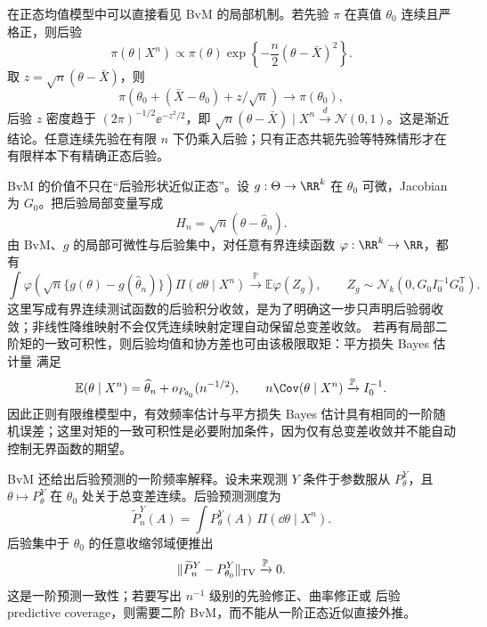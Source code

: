 \begin{workedexample}[正态似然仍须区别有限样本后验]
在正态均值模型中可以直接看见 BvM 的局部机制。若先验 $\pi$ 在真值 $\theta_0$ 连续且严格正，则后验
\[
\pi(\theta\mid X^n)\propto\pi(\theta)\exp\!\left\{-\frac n2(\theta-\bar X)^2\right\}.
\]
取 $z=\sqrt n(\theta-\bar X)$，则
\[
\pi(\theta_0+(\bar X-\theta_0)+z/\sqrt n)\to\pi(\theta_0),
\]
后验 $z$ 密度趋于 $(2\pi)^{-1/2}\ee^{-z^2/2}$，即 $\sqrt n(\theta-\bar X)\mid X^n\xrightarrow{d}\mathcal N(0,1)$。这是渐近结论。任意连续先验在有限 $n$ 下仍乘入后验；只有正态共轭先验等特殊情形才在有限样本下有精确正态后验。
\end{workedexample}

\begin{corollary}
BvM 的价值不只在“后验形状近似正态”。设 $g:\Theta\to\RR^k$ 在 $\theta_0$ 可微，Jacobian 为 $G_0$。把后验局部变量写成
\[
 H_n=\sqrt n(\theta-\widehat\theta_n).
\]
由 BvM、$g$ 的局部可微性与后验集中，对任意有界连续函数 $\varphi:\RR^k\to\RR$，都有
\begin{equation*}\int
 \varphi\!\left(
 \sqrt n\{g(\theta)-g(\widehat\theta_n)\}
 \right)
 \Pi(\dd\theta\mid X^n)
 \xrightarrow{\mathbb P}
 \mathbb E\varphi(Z_g),
 \qquad
 Z_g\sim\mathcal N_k(0,G_0I_0^{-1}G_0^{\mathsf T}).
\end{equation*}
这里写成有界连续测试函数的后验积分收敛，是为了明确这一步只声明后验弱收敛；非线性降维映射不会仅凭连续映射定理自动保留总变差收敛。
若再有局部二阶矩的一致可积性，则后验均值和协方差也可由该极限取矩：平方损失 Bayes 估计量 满足
\[
 \mathbb E(\theta\mid X^n)
 =\widehat\theta_n+o_{P_{\theta_0}}(n^{-1/2}),
 \qquad
 n\Cov(\theta\mid X^n)\xrightarrow{\mathbb P} I_0^{-1}.
\]
因此正则有限维模型中，有效频率估计与平方损失 Bayes 估计具有相同的一阶随机误差；这里对矩的一致可积性是必要附加条件，因为仅有总变差收敛并不能自动控制无界函数的期望。
\end{corollary}

\begin{proposition}[后验预测的一阶一致性]
BvM 还给出后验预测的一阶频率解释。设未来观测 $Y$ 条件于参数服从 $P_\theta^Y$，且 $\theta\mapsto P_\theta^Y$ 在 $\theta_0$ 处关于总变差连续。后验预测测度为
\[
 \widetilde P_n^Y(A)
 =\int P_\theta^Y(A)\,\Pi(\dd\theta\mid X^n).
\]
后验集中于 $\theta_0$ 的任意收缩邻域便推出
\[
 \|\widetilde P_n^Y-P_{\theta_0}^Y\|_{\rm TV}
 \xrightarrow{\mathbb P}0.
\]
这是一阶预测一致性；若要写出 $n^{-1}$ 级别的先验修正、曲率修正或 后验 predictive coverage，则需要二阶 BvM，而不能从一阶正态近似直接外推。
\end{proposition}


